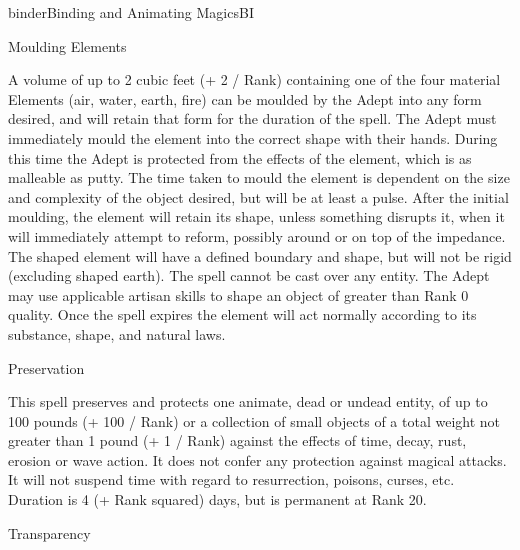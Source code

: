 \begin{College}[1.2]{binder}{Binding and Animating Magics}{BI}
\begin{spell}[G-8]{Moulding Elements}

\begin{effects}
A volume of up to 2 cubic feet (+ 2 / Rank) containing one of the four
material Elements (air, water, earth, fire) can be moulded by the
Adept into any form desired, and will retain that form for the
duration of the spell. The Adept must immediately mould the element
into the correct shape with their hands. During this time the Adept is
protected from the effects of the element, which is as malleable as
putty.  The time taken to mould the element is dependent on the size
and complexity of the object desired, but will be at least a pulse.
After the initial moulding, the element will retain its shape, unless
something disrupts it, when it will immediately attempt to reform,
possibly around or on top of the impedance.  The shaped element will
have a defined boundary and shape, but will not be rigid (excluding
shaped earth). The spell cannot be cast over any entity. The Adept may
use applicable artisan skills to shape an object of greater than Rank
0 quality. Once the spell expires the element will act normally
according to its substance, shape, and natural laws.
\end{effects}
\end{spell}

\begin{spell}[G-9]{Preservation}


\begin{effects}
This spell preserves and protects one animate, dead or undead entity,
of up to 100 pounds (+ 100 / Rank) or a collection of small objects of
a total weight not greater than 1 pound (+ 1 / Rank) against the
effects of time, decay, rust, erosion or wave action.  It does not
confer any protection against magical attacks.  It will not suspend
time with regard to resurrection, poisons, curses, etc.  Duration is 4
(+ Rank squared) days, but is permanent at Rank 20.
\end{effects}
\end{spell}

\begin{spell}[G-10]{Transparency}


\end{spell}
\end{College}
